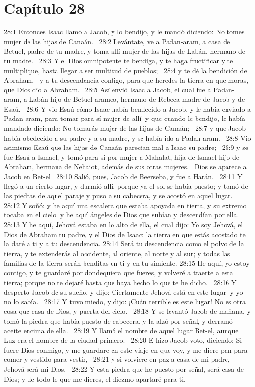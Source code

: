 \section*{Capítulo 28 }

28:1 Entonces Isaac llamó a Jacob, y lo bendijo, y le mandó diciendo: No tomes mujer de las hijas de Canaán.  
28:2 Levántate, ve a Padan-aram, a casa de Betuel, padre de tu madre, y toma allí mujer de las hijas de Labán, hermano de tu madre.  
28:3 Y el Dios omnipotente te bendiga, y te haga fructificar y te multiplique, hasta llegar a ser multitud de pueblos;  
28:4 y te dé la bendición de Abraham,  y a tu descendencia contigo, para que heredes la tierra en que moras, que Dios dio a Abraham.  
28:5 Así envió Isaac a Jacob, el cual fue a Padan-aram, a Labán hijo de Betuel arameo, hermano de Rebeca madre de Jacob y de Esaú.  
28:6 Y vio Esaú cómo Isaac había bendecido a Jacob, y le había enviado a Padan-aram, para tomar para sí mujer de allí; y que cuando le bendijo, le había mandado diciendo: No tomarás mujer de las hijas de Canaán;  
28:7 y que Jacob había obedecido a su padre y a su madre, y se había ido a Padan-aram.  
28:8 Vio asimismo Esaú que las hijas de Canaán parecían mal a Isaac su padre;  
28:9 y se fue Esaú a Ismael, y tomó para sí por mujer a Mahalat, hija de Ismael hijo de Abraham, hermana de Nebaiot, además de sus otras mujeres.  
Dios se aparece a Jacob en Bet-el  
28:10 Salió, pues, Jacob de Beerseba, y fue a Harán.  
28:11 Y llegó a un cierto lugar, y durmió allí, porque ya el sol se había puesto; y tomó de las piedras de aquel paraje y puso a su cabecera, y se acostó en aquel lugar.  
28:12 Y soñó: y he aquí una escalera que estaba apoyada en tierra, y su extremo tocaba en el cielo; y he aquí ángeles de Dios que subían y descendían por ella. 
28:13 Y he aquí, Jehová estaba en lo alto de ella, el cual dijo: Yo soy Jehová, el Dios de Abraham tu padre, y el Dios de Isaac; la tierra en que estás acostado te la daré a ti y a tu descendencia. 
28:14 Será tu descendencia como el polvo de la tierra, y te extenderás al occidente, al oriente, al norte y al sur; y todas las familias de la tierra serán benditas en ti y en tu simiente. 
28:15 He aquí, yo estoy contigo, y te guardaré por dondequiera que fueres, y volveré a traerte a esta tierra; porque no te dejaré hasta que haya hecho lo que te he dicho.  
28:16 Y despertó Jacob de su sueño, y dijo: Ciertamente Jehová está en este lugar, y yo no lo sabía.  
28:17 Y tuvo miedo, y dijo: ¡Cuán terrible es este lugar! No es otra cosa que casa de Dios, y puerta del cielo.  
28:18 Y se levantó Jacob de mañana, y tomó la piedra que había puesto de cabecera, y la alzó por señal, y derramó aceite encima de ella.  
28:19 Y llamó el nombre de aquel lugar Bet-el, aunque Luz era el nombre de la ciudad primero.  
28:20 E hizo Jacob voto, diciendo: Si fuere Dios conmigo, y me guardare en este viaje en que voy, y me diere pan para comer y vestido para vestir,  
28:21 y si volviere en paz a casa de mi padre, Jehová será mi Dios.  
28:22 Y esta piedra que he puesto por señal, será casa de Dios; y de todo lo que me dieres, el diezmo apartaré para ti.  
